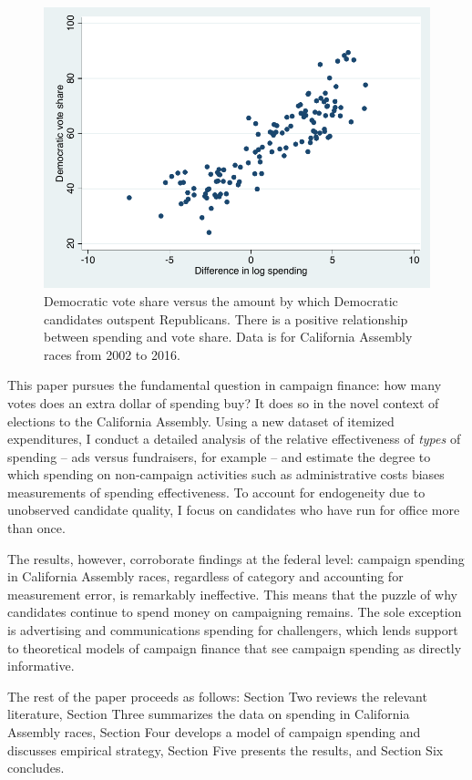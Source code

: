 \documentclass{article}
\begin{document}
\begin{figure}
  \centering
  \caption{Democratic vote share versus the amount by which Democratic candidates outspent Republicans. There is a positive relationship between spending and vote share. Data is for California Assembly races from 2002 to 2016.}
	\label{fig:vote-share-spending}
  \includegraphics[width=.8\linewidth]{../charts/diff.pdf}
\end{figure}

This paper pursues the fundamental question in campaign finance: how many votes does an extra dollar of spending buy? It does so in the novel context of elections to the California Assembly. Using a new dataset of itemized expenditures, I conduct a detailed analysis of the relative effectiveness of \textit{types} of spending -- ads versus fundraisers, for example -- and estimate the degree to which spending on non-campaign activities such as administrative costs biases measurements of spending effectiveness. To account for endogeneity due to unobserved candidate quality, I focus on candidates who have run for office more than once.

The results, however, corroborate findings at the federal level: campaign spending in California Assembly races, regardless of category and accounting for measurement error, is remarkably ineffective. This means that the puzzle of why candidates continue to spend money on campaigning remains. The sole exception is advertising and communications spending for challengers, which lends support to theoretical models of campaign finance that see campaign spending as directly informative.

The rest of the paper proceeds as follows: Section Two reviews the relevant literature, Section Three summarizes the data on spending in California Assembly races, Section Four develops a model of campaign spending and discusses empirical strategy, Section Five presents the results, and Section Six concludes.
\end{document}
